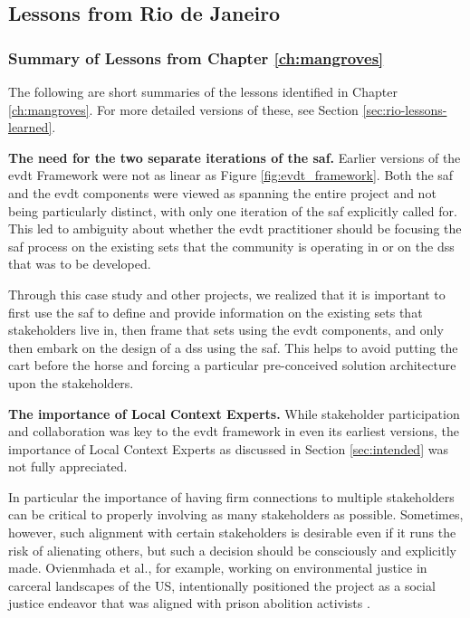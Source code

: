 \subsection{Lessons from Rio de Janeiro}

\subsubsection{Summary of Lessons from Chapter \ref{ch:mangroves}} 

The following are short summaries of the lessons identified in Chapter \ref{ch:mangroves}. For more detailed versions of these, see Section \ref{sec:rio-lessons-learned}.

\textbf{The need for the two separate iterations of the \ac{saf}.} Earlier versions of the \ac{evdt} Framework were not as linear as Figure \ref{fig:evdt_framework}. Both the \ac{saf} and the \ac{evdt} components were viewed as spanning the entire project and not being particularly distinct, with only one iteration of the \ac{saf} explicitly called for. This led to ambiguity about whether the \ac{evdt} practitioner should be focusing the \ac{saf} process on the existing {sets} that the community is operating in or on the \ac{dss} that was to be developed. 

Through this case study and other projects, we realized that it is important to first use the \ac{saf} to define and provide information on the existing \ac{sets} that stakeholders live in, then frame that \ac{sets} using the \ac{evdt} components, and only then embark on the design of a \ac{dss} using the \ac{saf}. This helps to avoid putting the cart before the horse and forcing a particular pre-conceived solution architecture upon the stakeholders. 

\textbf{The importance of Local Context Experts.} While stakeholder participation and collaboration was key to the \ac{evdt} framework in even its earliest versions, the importance of Local Context Experts as discussed in Section \ref{sec:intended} was not fully appreciated. 

In particular the importance of having firm connections to multiple stakeholders can be critical to properly involving as many stakeholders as possible. Sometimes, however, such alignment with certain stakeholders is desirable even if it runs the risk of alienating others, but such a decision should be consciously and explicitly made. Ovienmhada et al., for example, working on environmental justice in carceral landscapes of the US, intentionally positioned the project as a social justice endeavor that was aligned with prison abolition activists \cite{ovienmhadaEnvironmentVulnerabilityDecisionTechnologyModelingFramework2021}. 

